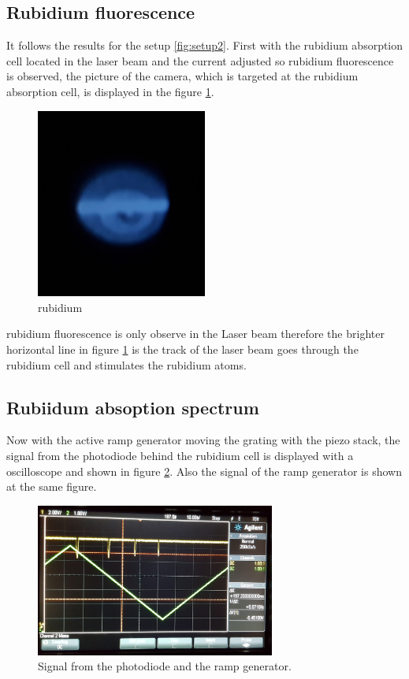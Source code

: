 \subsection{Rubidium fluorescence}
\label{subsec:RB_fluorescence}

It follows the results for the setup \ref{fig:setup2}.
First with the rubidium absorption cell located in the laser beam
and the current adjusted so rubidium fluorescence is observed, the picture of the
camera, which is targeted at the
rubidium absorption cell, is
displayed in the figure \ref{fig:Floures}.

\begin{figure}
  \centering
  \includegraphics[width = 0.5\textwidth]{figures/Rb_leuchten.jpg}
  \caption{rubidium }
  \label{fig:Floures}
\end{figure}

rubidium fluorescence is only observe in the Laser beam therefore
the brighter horizontal line
in figure \ref{fig:Floures}
is the track of the laser beam
goes through the rubidium cell and stimulates the rubidium atoms.

\subsection{Rubiidum absoption spectrum}
\label{subsec:Rubidium_absoptionspectrum}


Now with the active ramp generator moving the grating with the piezo stack,
the signal from the photodiode behind the rubidium cell
is displayed with a
oscilloscope and shown in figure \ref{fig:ramp}.
Also the signal of the ramp generator is shown at the same
figure.

\begin{figure}
  \centering
  \includegraphics[width = 0.7\textwidth]{figures/Ramp.jpg}
  \caption{Signal from the photodiode and the ramp generator.}
  \label{fig:ramp}
\end{figure}

